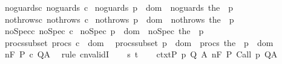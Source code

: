\begin{isabellebody}
\ noguards{\isacharunderscore}c{\isacharcolon}\ {\isachardoublequoteopen}noguards\ c{\isachardoublequoteclose}\isanewline
{}\ noguards{\isacharunderscore}{\isasymGamma}{\isacharcolon}\ {\isachardoublequoteopen}{\isasymforall}p\ {\isasymin}\ dom\ {\isasymGamma}{\isachardot}\ noguards\ {\isacharparenleft}the\ {\isacharparenleft}{\isasymGamma}\ p{\isacharparenright}{\isacharparenright}{\isachardoublequoteclose}\isanewline
{}\ nothrows{\isacharunderscore}c{\isacharcolon}\ {\isachardoublequoteopen}nothrows\ c{\isachardoublequoteclose}\isanewline
{}\ nothrows{\isacharunderscore}{\isasymGamma}{\isacharcolon}\ {\isachardoublequoteopen}{\isasymforall}p\ {\isasymin}\ dom\ {\isasymGamma}{\isachardot}\ nothrows\ {\isacharparenleft}the\ {\isacharparenleft}{\isasymGamma}\ p{\isacharparenright}{\isacharparenright}{\isachardoublequoteclose}\isanewline
{}\ noSpec{\isacharunderscore}c{\isacharcolon}\ {\isachardoublequoteopen}noSpec\ c{\isachardoublequoteclose}\isanewline
{}\ noSpec{\isacharunderscore}{\isasymGamma}{\isacharcolon}\ {\isachardoublequoteopen}{\isasymforall}p\ {\isasymin}\ dom\ {\isasymGamma}{\isachardot}\ noSpec\ {\isacharparenleft}the\ {\isacharparenleft}{\isasymGamma}\ p{\isacharparenright}{\isacharparenright}{\isachardoublequoteclose}\isanewline
{}\ procs{\isacharunderscore}subset{\isacharcolon}\ {\isachardoublequoteopen}procs\ c\ {\isasymsubseteq}\ dom\ {\isasymGamma}{\isachardoublequoteclose}\isanewline
{}\ procs{\isacharunderscore}subset{\isacharunderscore}{\isasymGamma}{\isacharcolon}\ {\isachardoublequoteopen}{\isasymforall}p\ {\isasymin}\ dom\ {\isasymGamma}{\isachardot}\ procs\ {\isacharparenleft}the\ {\isacharparenleft}{\isasymGamma}\ p{\isacharparenright}{\isacharparenright}\ {\isasymsubseteq}\ dom\ {\isasymGamma}{\isachardoublequoteclose}\isanewline
{}\ {\isachardoublequoteopen}{\isasymGamma}{\isacharcomma}{\isasymTheta}{\isasymTurnstile}n{\isacharcolon}\isactrlbsub {\isacharslash}F\isactrlesub \ P\ c\ Q{\isacharcomma}A\ {\isachardoublequoteclose}\isanewline
%
\isadelimproof
%
\endisadelimproof
%
\isatagproof
{}\isamarkupfalse%
\ {\isacharparenleft}rule\ cnvalidI{\isacharparenright}\isanewline
\ \ \isamarkupfalse%
\ s\ t\isanewline
\ \ \isamarkupfalse%
\ ctxt{\isacharcolon}{\isachardoublequoteopen}{\isasymforall}{\isacharparenleft}P{\isacharcomma}\ p{\isacharcomma}\ Q{\isacharcomma}\ A{\isacharparenright}{\isasymin}{\isasymTheta}{\isachardot}\ {\isasymGamma}{\isasymTurnstile}n{\isacharcolon}\isactrlbsub {\isacharslash}F\isactrlesub \ P\ {\isacharparenleft}Call\ p{\isacharparenright}\ Q{\isacharcomma}A{\isachardoublequoteclose}\isanewline

\end{isabellebody}
